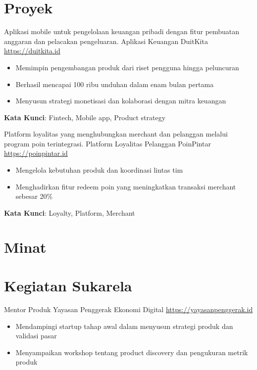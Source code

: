 \documentclass[a4paper, serif, 10pt]{moderncv}
\begin{document}
\section{Proyek}

        {Aplikasi mobile untuk pengelolaan keuangan pribadi dengan fitur pembuatan anggaran dan pelacakan pengeluaran.}
        {Aplikasi Keuangan DuitKita}
        {\url{https://duitkita.id}}
        {}
        {\begin{itemize}
\item Memimpin pengembangan produk dari riset pengguna hingga peluncuran
\item Berhasil mencapai 100 ribu unduhan dalam enam bulan pertama
\item Menyusun strategi monetisasi dan kolaborasi dengan mitra keuangan
\end{itemize}
\textbf{Kata Kunci}: Fintech, Mobile app, Product strategy}

        {Platform loyalitas yang menghubungkan merchant dan pelanggan melalui program poin terintegrasi.}
        {Platform Loyalitas Pelanggan PoinPintar}
        {\url{https://poinpintar.id}}
        {}
        {\begin{itemize}
\item Mengelola kebutuhan produk dan koordinasi lintas tim
\item Menghadirkan fitur redeem poin yang meningkatkan transaksi merchant sebesar 20\%
\end{itemize}
\textbf{Kata Kunci}: Loyalty, Platform, Merchant}
\section{Minat}

\section{Kegiatan Sukarela}

        {Mentor Produk}
        {Yayasan Penggerak Ekonomi Digital}
        {\url{https://yayasanpenggerak.id}}
        {}
        {\begin{itemize}
\item Mendampingi startup tahap awal dalam menyusun strategi produk dan validasi pasar
\item Menyampaikan workshop tentang product discovery dan pengukuran metrik produk
\end{itemize}}
\end{document}
